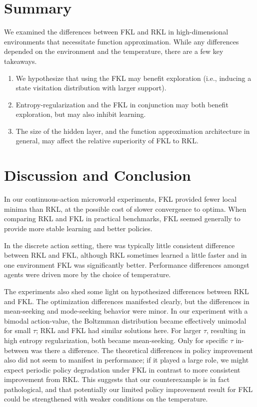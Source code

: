 \documentclass[twoside,11pt]{article}
\begin{document}
\section{Summary}
We examined the differences between FKL and RKL in high-dimensional environments that necessitate function approximation. While any differences depended on the environment and the temperature, there are a few key takeaways. 
\begin{enumerate}
    \item We hypothesize that using the FKL may benefit exploration (i.e., inducing a state visitation distribution with larger support).
    \item Entropy-regularization and the FKL in conjunction may both benefit exploration, but may also inhibit learning. 
    \item The size of the hidden layer, and the function approximation architecture in general, may affect the relative superiority of FKL to RKL. 
\end{enumerate}



\section{Discussion and Conclusion} 

In our continuous-action microworld experiments, FKL provided fewer local minima than RKL, at the possible cost of slower convergence to optima. When comparing RKL and FKL in practical benchmarks, FKL seemed generally to provide more stable learning and better policies.

In the discrete action setting, there was typically little consistent difference between RKL and FKL, although RKL sometimes learned a little faster and in one environment FKL was significantly better. Performance differences amongst agents were driven more by the choice of temperature. 

The experiments also shed some light on hypothesized differences between RKL and FKL. The optimization differences manifested clearly, but the differences in mean-seeking and mode-seeking behavior were minor. In our experiment with a bimodal action-value, the Boltzmman distribution became effectively unimodal for small $\tau$; RKL and FKL had similar solutions here. For larger $\tau$, resulting in high entropy regularization, both became mean-seeking. Only for specific $\tau$ in-between was there a difference. The theoretical differences in policy improvement also did not seem to manifest in performance; if it played a large role, we might expect periodic policy degradation under FKL in contrast to more consistent improvement from RKL. This suggests that our counterexample is in fact pathological, and that potentially our limited policy improvement result for FKL could be strengthened with weaker conditions on the temperature.
\end{document}
